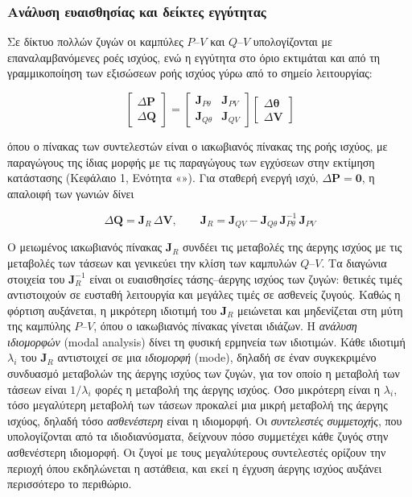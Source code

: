 \subsubsection{Ανάλυση ευαισθησίας και δείκτες εγγύτητας}

Σε δίκτυο πολλών ζυγών οι καμπύλες $P$--$V$ και $Q$--$V$ υπολογίζονται με επαναλαμβανόμενες
ροές ισχύος, ενώ η εγγύτητα στο όριο εκτιμάται και από τη γραμμικοποίηση των εξισώσεων ροής
ισχύος γύρω από το σημείο λειτουργίας:

\begin{equation}
\begin{bmatrix} \Delta\mathbf{P} \\ \Delta\mathbf{Q} \end{bmatrix} =
\begin{bmatrix} \mathbf{J}_{P\theta} & \mathbf{J}_{PV} \\
                \mathbf{J}_{Q\theta} & \mathbf{J}_{QV} \end{bmatrix}
\begin{bmatrix} \Delta\boldsymbol{\theta} \\ \Delta\mathbf{V} \end{bmatrix}
\label{eq:pf-jacobian}
\end{equation}

όπου ο πίνακας των συντελεστών είναι ο ιακωβιανός πίνακας της ροής ισχύος, με παραγώγους της ίδιας μορφής με τις
παραγώγους των εγχύσεων στην εκτίμηση κατάστασης (Κεφάλαιο 1, Ενότητα «»).
Για σταθερή ενεργή ισχύ, $\Delta\mathbf{P} = \mathbf{0}$, η απαλοιφή των γωνιών δίνει

\begin{equation}
\Delta\mathbf{Q} = \mathbf{J}_R\,\Delta\mathbf{V}, \qquad
\mathbf{J}_R = \mathbf{J}_{QV} - \mathbf{J}_{Q\theta}\,\mathbf{J}_{P\theta}^{-1}\,\mathbf{J}_{PV}
\label{eq:jr}
\end{equation}

Ο μειωμένος ιακωβιανός πίνακας $\mathbf{J}_R$ συνδέει τις μεταβολές της άεργης ισχύος με τις
μεταβολές των τάσεων και γενικεύει την κλίση των καμπυλών $Q$--$V$. Τα διαγώνια στοιχεία του
$\mathbf{J}_R^{-1}$ είναι οι ευαισθησίες τάσης--άεργης ισχύος των ζυγών: θετικές τιμές
αντιστοιχούν σε ευσταθή λειτουργία και μεγάλες τιμές σε ασθενείς ζυγούς. Καθώς η φόρτιση
αυξάνεται, η μικρότερη ιδιοτιμή του $\mathbf{J}_R$ μειώνεται και μηδενίζεται στη μύτη της
καμπύλης $P$--$V$, όπου ο ιακωβιανός πίνακας γίνεται ιδιάζων. Η \emph{ανάλυση ιδιομορφών} (modal
analysis) δίνει τη φυσική ερμηνεία των ιδιοτιμών. Κάθε ιδιοτιμή $\lambda_i$ του $\mathbf{J}_R$
αντιστοιχεί σε μια \emph{ιδιομορφή} (mode), δηλαδή σε έναν συγκεκριμένο συνδυασμό μεταβολών της άεργης
ισχύος των ζυγών, για τον οποίο η μεταβολή των τάσεων είναι $1/\lambda_i$ φορές η μεταβολή της
άεργης ισχύος. Όσο μικρότερη είναι η $\lambda_i$, τόσο μεγαλύτερη μεταβολή των τάσεων προκαλεί
μια μικρή μεταβολή της άεργης ισχύος, δηλαδή τόσο \emph{ασθενέστερη} είναι η ιδιομορφή. Οι
\emph{συντελεστές συμμετοχής}, που υπολογίζονται από τα ιδιοδιανύσματα, δείχνουν πόσο
συμμετέχει κάθε ζυγός στην ασθενέστερη ιδιομορφή. Οι ζυγοί με τους μεγαλύτερους συντελεστές
ορίζουν την περιοχή όπου εκδηλώνεται η αστάθεια, και εκεί η έγχυση άεργης ισχύος αυξάνει
περισσότερο το περιθώριο.

